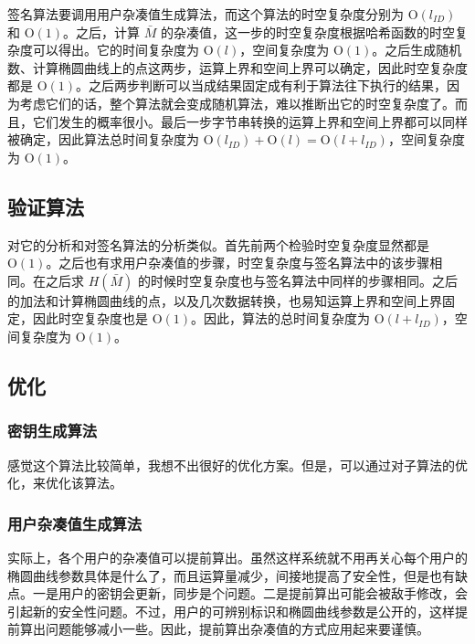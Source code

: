 \documentclass[12pt,a4paper]{article}
\begin{document}
签名算法要调用用户杂凑值生成算法，而这个算法的时空复杂度分别为 $ \mathrm{O}(l_{ID}) $ 和 $ \mathrm{O}(1) $。之后，计算 $ \bar{M} $ 的杂凑值，这一步的时空复杂度根据哈希函数的时空复杂度可以得出。它的时间复杂度为 $ \mathrm{O}(l) $，空间复杂度为 $ \mathrm{O}(1) $。之后生成随机数、计算椭圆曲线上的点这两步，运算上界和空间上界可以确定，因此时空复杂度都是 $ \mathrm{O}(1) $。之后两步判断可以当成结果固定成有利于算法往下执行的结果，因为考虑它们的话，整个算法就会变成随机算法，难以推断出它的时空复杂度了。而且，它们发生的概率很小。最后一步字节串转换的运算上界和空间上界都可以同样被确定，因此算法总时间复杂度为 $ \mathrm{O}(l_{ID}) + \mathrm{O}(l) = \mathrm{O}(l + l_{ID}) $，空间复杂度为 $ \mathrm{O}(1) $。

\subsection*{验证算法}

对它的分析和对签名算法的分析类似。首先前两个检验时空复杂度显然都是 $ \mathrm{O}(1) $。之后也有求用户杂凑值的步骤，时空复杂度与签名算法中的该步骤相同。在之后求 $ H(\bar{M}) $ 的时候时空复杂度也与签名算法中同样的步骤相同。之后的加法和计算椭圆曲线的点，以及几次数据转换，也易知运算上界和空间上界固定，因此时空复杂度也是 $ \mathrm{O}(1) $。因此，算法的总时间复杂度为 $ \mathrm{O}(l + l_{ID}) $，空间复杂度为 $ \mathrm{O}(1) $。

\subsection*{优化}

\subsubsection*{密钥生成算法}

感觉这个算法比较简单，我想不出很好的优化方案。但是，可以通过对子算法的优化，来优化该算法。

\subsubsection*{用户杂凑值生成算法}

实际上，各个用户的杂凑值可以提前算出。虽然这样系统就不用再关心每个用户的椭圆曲线参数具体是什么了，而且运算量减少，间接地提高了安全性，但是也有缺点。一是用户的密钥会更新，同步是个问题。二是提前算出可能会被敌手修改，会引起新的安全性问题。不过，用户的可辨别标识和椭圆曲线参数是公开的，这样提前算出问题能够减小一些。因此，提前算出杂凑值的方式应用起来要谨慎。
\end{document}
